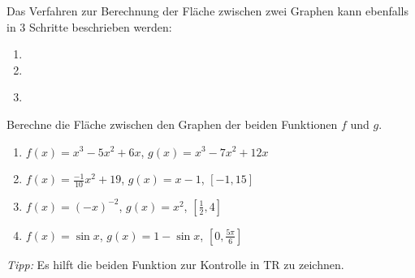 \documentclass[11pt,oneside]{article}
\begin{document}
	\begin{algo}
		Das Verfahren zur Berechnung der Fläche zwischen zwei Graphen kann ebenfalls in $3$ Schritte beschrieben werden:
		\begin{enumerate}
			\item {}
			\item {}
			\item \gap{14}\\[7pt]
		\end{enumerate}
	\end{algo}
	\begin{aufgabe}
		Berechne die Fläche zwischen den Graphen der beiden Funktionen $f$ und $g$.
		\begin{enumerate}[label=\alph*)]
			\item $f(x)=x^3-5x^2+6x$, $g(x)=x^3-7x^2+12x$
			\item $f(x)=\frac{-1}{10}x^2+19$, $g(x)=x-1$, $\left[-1,15\right]$
			\item $f(x)=(-x)^{-2}$, $g(x)=x^2$, $\left[\frac{1}{2},4\right]$
			\item $f(x)=\sin{x}$, $g(x)=1-\sin{x}$, $\left[0,\frac{5\pi}{6}\right]$
		\end{enumerate}
		\textit{Tipp:} Es hilft die beiden Funktion zur Kontrolle in TR zu zeichnen.
	\end{aufgabe}
\end{document}
